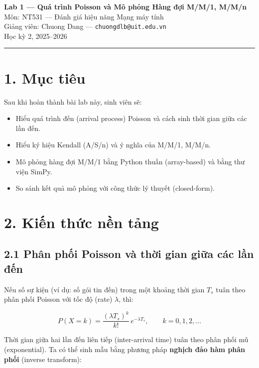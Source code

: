 \documentclass[12pt,a4paper]{article}
\begin{document}
\begin{center}
  {\LARGE\bfseries\sffamily Lab 1 — Quá trình Poisson và Mô phỏng Hàng đợi M/M/1, M/M/n}\\[0.5em]
  {\large Môn: NT531 — Đánh giá hiệu năng Mạng máy tính}\\[0.3em]
  {\normalsize Giảng viên: Chuong Dang --- \texttt{chuongdlb@uit.edu.vn}}\\[0.2em]
  {\normalsize Học kỳ 2, 2025–2026}
\end{center}
\vspace{1em}
\hrule
\vspace{1.5em}

\section{1. Mục tiêu}
Sau khi hoàn thành bài lab này, sinh viên sẽ:
\begin{itemize}[nosep]
  \item Hiểu quá trình đến (arrival process) Poisson và cách sinh thời gian giữa các lần đến.
  \item Hiểu ký hiệu Kendall (A/S/n) và ý nghĩa của M/M/1, M/M/n.
  \item Mô phỏng hàng đợi M/M/1 bằng Python thuần (array-based) và bằng thư viện SimPy.
  \item So sánh kết quả mô phỏng với công thức lý thuyết (closed-form).
\end{itemize}

\section{2. Kiến thức nền tảng}

\subsection{2.1 Phân phối Poisson và thời gian giữa các lần đến}

Nếu số sự kiện (ví dụ: số gói tin đến) trong một khoảng thời gian $T_s$ tuân theo phân phối Poisson với tốc độ (rate) $\lambda$, thì:

\[
  P(X = k) = \frac{(\lambda T_s)^k}{k!}\, e^{-\lambda T_s}, \qquad k = 0, 1, 2, \ldots
\]

Thời gian giữa hai lần đến liên tiếp (inter-arrival time) tuân theo phân phối mũ (exponential). Ta có thể sinh mẫu bằng phương pháp \textbf{nghịch đảo hàm phân phối} (inverse transform):
\end{document}
